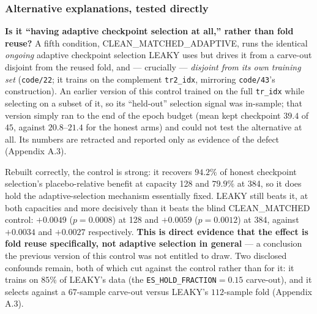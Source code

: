 \documentclass[10pt]{article} %
\begin{document}
\subsubsection{Alternative explanations, tested directly}

\textbf{Is it ``having adaptive checkpoint selection at all,'' rather than fold
reuse?} A fifth condition, CLEAN\_MATCHED\_ADAPTIVE, runs the identical
\emph{ongoing} adaptive checkpoint selection LEAKY uses but drives it from a
carve-out disjoint from the reused fold, and --- crucially --- \emph{disjoint
from its own training set} (\texttt{code/22}; it trains on the complement
\texttt{tr2\_idx}, mirroring \texttt{code/43}'s construction). An earlier
version of this control trained on the full \texttt{tr\_idx} while selecting on
a subset of it, so its ``held-out'' selection signal was in-sample; that version
simply ran to the end of the epoch budget (mean kept checkpoint $39.4$ of $45$,
against $20.8$--$21.4$ for the honest arms) and could not test the alternative
at all. Its numbers are retracted and reported only as evidence of the defect
(Appendix A.3).

Rebuilt correctly, the control is strong: it recovers $94.2\%$ of honest
checkpoint selection's placebo-relative benefit at capacity 128 and $79.9\%$ at
384, so it does hold the adaptive-selection mechanism essentially fixed. LEAKY
still beats it, at both capacities and more decisively than it beats the blind
CLEAN\_MATCHED control: $+0.0049$ ($p=0.0008$) at 128 and $+0.0059$ ($p=0.0012$)
at 384, against $+0.0034$ and $+0.0027$ respectively. \textbf{This is direct
evidence that the effect is fold reuse specifically, not adaptive selection in
general} --- a conclusion the previous version of this control was not entitled
to draw. Two disclosed confounds remain, both of which cut against the control
rather than for it: it trains on $85\%$ of LEAKY's data (the
\texttt{ES\_HOLD\_FRACTION}$=0.15$ carve-out), and it selects against a
$67$-sample carve-out versus LEAKY's $112$-sample fold (Appendix A.3).
\end{document}
